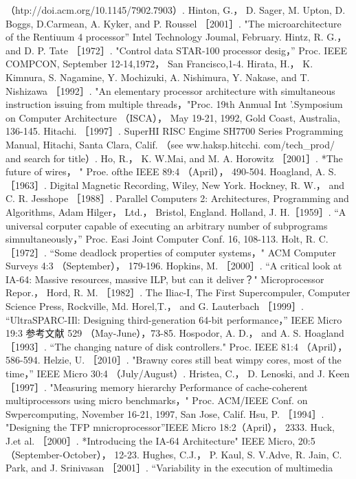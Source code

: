 （htp://doi.acm.org/10.1145/7902.7903）.
Hinton, G.， D. Sager, M. Upton, D. Boggs, D.Carmean, A. Kyker, and P. Roussel ［2001］. "The microarchitecture of the Rentiuum
4 processor” Intel Technology Joumal, February.
Hintz, R. G.， and D. P. Tate ［1972］. "Control data STAR-100 processor desig，” Proc. IEEE COMPCON, September 12-14,1972，
San Francisco,1-4.
Hirata, H.， K. Kimnura, S. Nagamine, Y. Mochizuki, A. Nishimura, Y. Nakase, and T. Nishizawa ［1992］. "An elementary
processor architecture with simultaneous instruction issuing from multiple threads，"Proc. 19th Anmual Int '.Symposium on
Computer Architecture （ISCA）， May 19-21, 1992, Gold Coast, Australia, 136-145.
Hitachi. ［1997］. SuperHI RISC Engime SH7700 Series Programming Manual, Hitachi, Santa Clara, Calif. （see ww.haksp.hitcchi.
com/tech_prod/ and search for title）.
Ho, R.， K. W.Mai, and M. A. Horowitz ［2001］. *The future of wires， " Proe. ofthe IEEE 89:4 （April）， 490-504.
Hoagland, A. S. ［1963］. Digital Magnetic Recording, Wiley, New York.
Hockney, R. W.， and C. R. Jesshope ［1988］. Parallel Computers 2: Architectures, Programming and Algorithms, Adam Hilger，
Ltd.， Bristol, England.
Holland, J. H.［1959］. “A universal corputer capable of executing an arbitrary number of subprograms simnultaneously，” Proc.
Easi Joint Computer Conf. 16, 108-113.
Holt, R. C. ［1972］. “Some deadlock properties of computer systems，" ACM Computer Surveys 4:3 （September）， 179-196.
Hopkins, M. ［2000］. “A critical look at IA-64: Massive resources, massive ILP, but can it deliver？" Microprocessor Repor.，
Hord, R. M. ［1982］. The Iliac-I, The First Supercompuler, Computer Science Press, Rockville, Md.
Horel,T.， and G. Lauterbach ［1999］. “UltraSPARC-IIl: Designing third-generation 64-bit performance，” IEEE Micro 19:3
参考文献
529
（May-June），73-85.
Hospodor, A. D.， and A. S. Hoagland ［1993］. “The changing nature of disk controllers." Proc. IEEE 81:4 （April）， 586-594.
Helzie, U. ［2010］. "Brawny cores still beat wimpy cores, most of the time，” IEEE Micro 30:4 （July/August）.
Hristea, C.， D. Lenoski, and J. Keen ［1997］. "Measuring memory hierarchy Performance of cache-coherent multiprocessors using
micro benchmarks，" Proc. ACM/IEEE Conf. on Swpercomputing, November 16-21, 1997, San Jose, Calif.
Hsu, P. ［1994］. "Designing the TFP mnicroprocessor”IEEE Micro 18:2（April）， 2333.
Huck, J.et al. ［2000］. *Introducing the IA-64 Architecture" IEEE Micro, 20:5 （September-October）， 12-23.
Hughes, C.J.， P. Kaul, S. V.Adve, R. Jain, C. Park, and J. Srinivasan ［2001］. “Variability in the execution of multimedia
